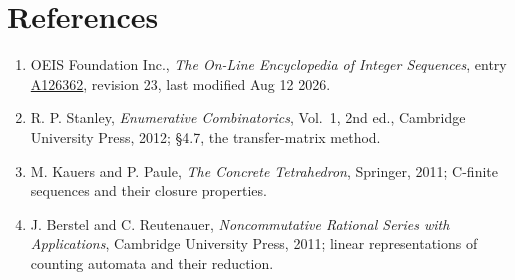 \documentclass[11pt]{article}
\theoremstyle{definition}
\begin{document}
\section{References}

\begin{enumerate}

\item OEIS Foundation Inc., \emph{The On-Line Encyclopedia of Integer Sequences}, entry \href{https://oeis.org/A126362}{A126362}, revision 23, last modified Aug 12 2026.

\item R. P. Stanley, \emph{Enumerative Combinatorics}, Vol.~1, 2nd ed., Cambridge University Press, 2012; \S4.7, the transfer-matrix method.

\item M. Kauers and P. Paule, \emph{The Concrete Tetrahedron}, Springer, 2011; C-finite sequences and their closure properties.

\item J. Berstel and C. Reutenauer, \emph{Noncommutative Rational Series with Applications}, Cambridge University Press, 2011; linear representations of counting automata and their reduction.

\end{enumerate}
\end{document}
